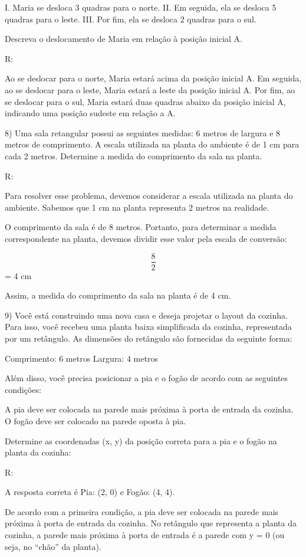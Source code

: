 I. Maria se desloca 3 quadras para o norte. II. Em seguida, ela se
desloca 5 quadras para o leste. III. Por fim, ela se desloca 2 quadras
para o sul.

Descreva o deslocamento de Maria em relação à posição inicial A.

R:

Ao se deslocar para o norte, Maria estará acima da posição inicial A. Em
seguida, ao se deslocar para o leste, Maria estará a leste da posição
inicial A. Por fim, ao se deslocar para o sul, Maria estará duas quadras
abaixo da posição inicial A, indicando uma posição sudeste em relação a
A.

8) Uma sala retangular possui as seguintes medidas: 6 metros de largura
e 8 metros de comprimento. A escala utilizada na planta do ambiente é de
1 cm para cada 2 metros. Determine a medida do comprimento da sala na
planta.

R:

Para resolver esse problema, devemos considerar a escala utilizada na
planta do ambiente. Sabemos que 1 cm na planta representa 2 metros na
realidade.

O comprimento da sala é de 8 metros. Portanto, para determinar a medida
correspondente na planta, devemos dividir esse valor pela escala de
conversão:

\[\frac {8}{2}\] = 4 cm

Assim, a medida do comprimento da sala na planta é de 4 cm.

9) Você está construindo uma nova casa e deseja projetar o layout da
cozinha. Para isso, você recebeu uma planta baixa simplificada da
cozinha, representada por um retângulo. As dimensões do retângulo são
fornecidas da seguinte forma:

Comprimento: 6 metros Largura: 4 metros

Além disso, você precisa posicionar a pia e o fogão de acordo com as
seguintes condições:

A pia deve ser colocada na parede mais próxima à porta de entrada da
cozinha. O fogão deve ser colocado na parede oposta à pia.

Determine as coordenadas (x, y) da posição correta para a pia e o fogão
na planta da cozinha:

R:

A resposta correta é Pia: (2, 0) e Fogão: (4, 4).

De acordo com a primeira condição, a pia deve ser colocada na parede
mais próxima à porta de entrada da cozinha. No retângulo que representa
a planta da cozinha, a parede mais próxima à porta de entrada é a parede
com y = 0 (ou seja, no ``chão'' da planta).

